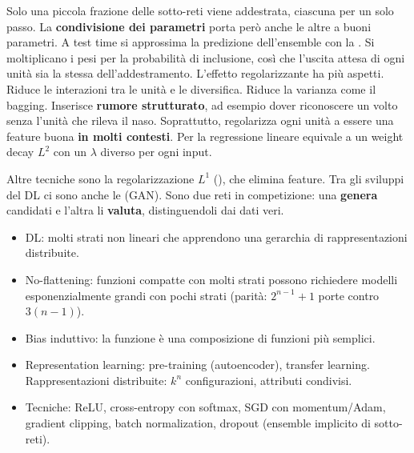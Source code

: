 Solo una piccola frazione delle sotto-reti viene addestrata, ciascuna per un solo passo. La \textbf{condivisione
dei parametri} porta però anche le altre a buoni parametri. A test time si approssima la predizione dell'ensemble
con la . Si moltiplicano i pesi per la probabilità di inclusione, così che
l'uscita attesa di ogni unità sia la stessa dell'addestramento. L'effetto regolarizzante ha più aspetti. Riduce le
interazioni tra le unità e le diversifica. Riduce la varianza come il bagging. Inserisce \textbf{rumore
strutturato}, ad esempio dover riconoscere un volto senza l'unità che rileva il naso. Soprattutto, regolarizza
ogni unità a essere una feature buona \textbf{in molti contesti}. Per la regressione lineare equivale a un weight
decay $L^2$ con un $\lambda$ diverso per ogni input.

Altre tecniche sono la regolarizzazione $L^1$ (), che elimina feature. Tra gli sviluppi del DL ci sono
anche le  (GAN). Sono due reti in competizione: una \textbf{genera}
candidati e l'altra li \textbf{valuta}, distinguendoli dai dati veri.

\begin{puntichiave}
\begin{itemize}
  \item DL: molti strati non lineari che apprendono una gerarchia di rappresentazioni distribuite.
  \item No-flattening: funzioni compatte con molti strati possono richiedere modelli esponenzialmente grandi con pochi
        strati (parità: $2^{n-1}+1$ porte contro $3(n-1)$).
  \item Bias induttivo: la funzione è una composizione di funzioni più semplici.
  \item Representation learning: pre-training (autoencoder), transfer learning. Rappresentazioni distribuite: $k^n$
        configurazioni, attributi condivisi.
  \item Tecniche: ReLU, cross-entropy con softmax, SGD con momentum/Adam, gradient clipping, batch normalization,
        dropout (ensemble implicito di sotto-reti).
\end{itemize}
\end{puntichiave}

